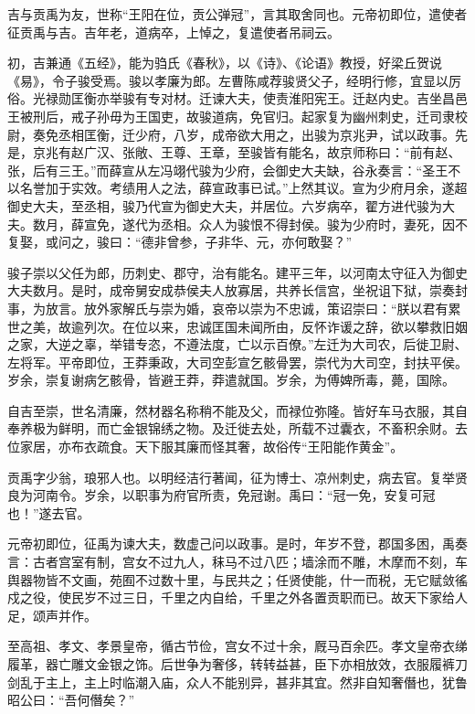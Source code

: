 \documentclass[12pt,UTF8]{ctexbook}
\begin{document}
吉与贡禹为友，世称“王阳在位，贡公弹冠”，言其取舍同也。元帝初即位，遣使者征贡禹与吉。吉年老，道病卒，上悼之，复遣使者吊祠云。



初，吉兼通《五经》，能为驺氏《春秋》，以《诗》、《论语》教授，好梁丘贺说《易》，令子骏受焉。骏以孝廉为郎。左曹陈咸荐骏贤父子，经明行修，宜显以厉俗。光禄勋匡衡亦举骏有专对材。迁谏大夫，使责淮阳宪王。迁赵内史。吉坐昌邑王被刑后，戒子孙毋为王国吏，故骏道病，免官归。起家复为幽州刺史，迁司隶校尉，奏免丞相匡衡，迁少府，八岁，成帝欲大用之，出骏为京兆尹，试以政事。先是，京兆有赵广汉、张敞、王尊、王章，至骏皆有能名，故京师称曰：“前有赵、张，后有三王。”而薛宣从左冯翊代骏为少府，会御史大夫缺，谷永奏言：“圣王不以名誉加于实效。考绩用人之法，薛宣政事已试。”上然其议。宣为少府月余，遂超御史大夫，至丞相，骏乃代宣为御史大夫，并居位。六岁病卒，翟方进代骏为大夫。数月，薛宣免，遂代为丞相。众人为骏恨不得封侯。骏为少府时，妻死，因不复娶，或问之，骏曰：“德非曾参，子非华、元，亦何敢娶？”



骏子崇以父任为郎，历刺史、郡守，治有能名。建平三年，以河南太守征入为御史大夫数月。是时，成帝舅安成恭侯夫人放寡居，共养长信宫，坐祝诅下狱，崇奏封事，为放言。放外家解氏与崇为婚，哀帝以崇为不忠诚，策诏崇曰：“朕以君有累世之美，故逾列次。在位以来，忠诚匡国未闻所由，反怀诈谖之辞，欲以攀救旧姻之家，大逆之辜，举错专恣，不遵法度，亡以示百僚。”左迁为大司农，后徙卫尉、左将军。平帝即位，王莽秉政，大司空彭宣乞骸骨罢，崇代为大司空，封扶平侯。岁余，崇复谢病乞骸骨，皆避王莽，莽遣就国。岁余，为傅婢所毒，薨，国除。



自吉至崇，世名清廉，然材器名称稍不能及父，而禄位弥隆。皆好车马衣服，其自奉养极为鲜明，而亡金银锦绣之物。及迁徙去处，所载不过囊衣，不畜积余财。去位家居，亦布衣疏食。天下服其廉而怪其奢，故俗传“王阳能作黄金”。



贡禹字少翁，琅邪人也。以明经洁行著闻，征为博士、凉州刺史，病去官。复举贤良为河南令。岁余，以职事为府官所责，免冠谢。禹曰：“冠一免，安复可冠也！”遂去官。



元帝初即位，征禹为谏大夫，数虚己问以政事。是时，年岁不登，郡国多困，禹奏言：古者宫室有制，宫女不过九人，秣马不过八匹；墙涂而不雕，木摩而不刻，车舆器物皆不文画，苑囿不过数十里，与民共之；任贤使能，什一而税，无它赋敛徭戍之役，使民岁不过三日，千里之内自给，千里之外各置贡职而已。故天下家给人足，颂声并作。



至高祖、孝文、孝景皇帝，循古节俭，宫女不过十余，厩马百余匹。孝文皇帝衣绨履革，器亡雕文金银之饰。后世争为奢侈，转转益甚，臣下亦相放效，衣服履裤刀剑乱于主上，主上时临潮入庙，众人不能别异，甚非其宜。然非自知奢僭也，犹鲁昭公曰：“吾何僭矣？”
\end{document}

